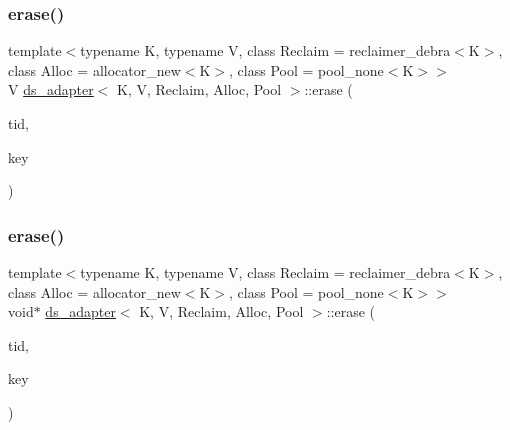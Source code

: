 \subsubsection{\texorpdfstring{erase()}{erase()}\hspace{0.1cm}{\footnotesize\ttfamily [15/26]}}
{\footnotesize\ttfamily template$<$typename K, typename V, class Reclaim = reclaimer\+\_\+debra$<$\+K$>$, class Alloc = allocator\+\_\+new$<$\+K$>$, class Pool = pool\+\_\+none$<$\+K$>$$>$ \\
V \hyperlink{classds__adapter}{ds\+\_\+adapter}$<$ K, V, Reclaim, Alloc, Pool $>$\+::erase (\begin{DoxyParamCaption}\item[{const int}]{tid,  }\item[{const K \&}]{key }\end{DoxyParamCaption})\hspace{0.3cm}{\ttfamily [inline]}}

\mbox{\label{classds__adapter_ab6d8405f4336acb66453fdd95fae7b43}} 
\subsubsection{\texorpdfstring{erase()}{erase()}\hspace{0.1cm}{\footnotesize\ttfamily [16/26]}}
{\footnotesize\ttfamily template$<$typename K, typename V, class Reclaim = reclaimer\+\_\+debra$<$\+K$>$, class Alloc = allocator\+\_\+new$<$\+K$>$, class Pool = pool\+\_\+none$<$\+K$>$$>$ \\
void$\ast$ \hyperlink{classds__adapter}{ds\+\_\+adapter}$<$ K, V, Reclaim, Alloc, Pool $>$\+::erase (\begin{DoxyParamCaption}\item[{const int}]{tid,  }\item[{const K \&}]{key }\end{DoxyParamCaption})\hspace{0.3cm}{\ttfamily [inline]}}

\mbox{\label{classds__adapter_a1bf459e8449df93cc738a644aeffdcfb}} 
